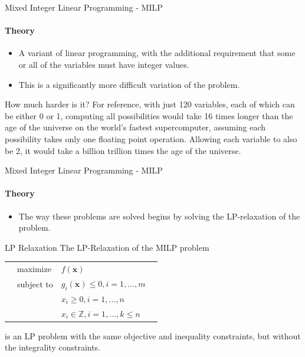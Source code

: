 \documentclass{beamer}
\renewcommand{\vec}{\mathbf}
\begin{document}
	\begin{frame}{Mixed Integer Linear Programming - MILP}
		\framesubtitle{Theory}
		\begin{itemize}
			\item A variant of linear programming, with the additional requirement that some or all of the variables must have integer values. 
			\item This is a significantly more difficult variation of the problem.
		\end{itemize}
		\begin{block}{How much harder is it?}
			For reference, with just 120 variables, each of which can be either 0 or 1, computing all possibilities would take 16 times longer than the age of the universe on the world's fastest supercomputer, assuming each possibility takes only one floating point operation. Allowing each variable to also be 2, it would take a billion trillion times the age of the universe.
		\end{block}
	\end{frame}
%	
%	
	\begin{frame}{Mixed Integer Linear Programming - MILP}
		\framesubtitle{Theory}
		\begin{itemize}
			\item The way these problems are solved begins by solving the LP-relaxation of the problem.
		\end{itemize}
		\begin{block}{LP Relaxation}
			The LP-Relaxation of the MILP problem 
			\begin{tabularx}{\textwidth}{X l l X}
				& maximize		& $f(\vec{x})$		& \\
				& subject to	& $g_i(\vec{x}) \leq 0, i=1,...,m$	& \\
				& 				& $x_i \geq 0, i=1,...,n$ & \\
				& 				& $x_i\in\mathbb{Z}, i=1,...,k\leq n$ &
			\end{tabularx}
			is an LP problem with the same objective and inequality constraints, but without the integrality constraints.
		\end{block}
	\end{frame}
\end{document}
